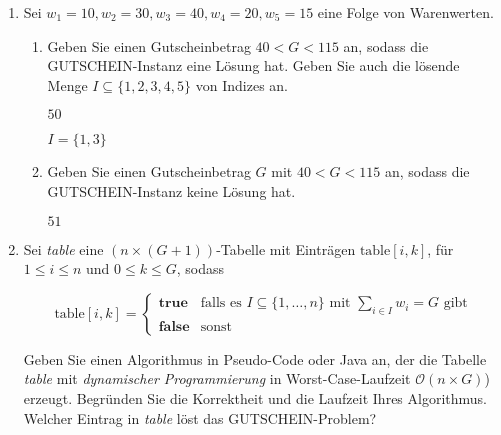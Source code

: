 \documentclass{bschlangaul-aufgabe}
\begin{document}
\begin{enumerate}


\item Sei $w_1 = 10, w_2 = 30, w_3 = 40, w_4 = 20, w_5 = 15$ eine Folge
von Warenwerten.

\begin{enumerate}


\item Geben Sie einen Gutscheinbetrag $40 < G < 115$ an, sodass die
GUT\-SCHEIN-Instanz eine Lösung hat. Geben Sie auch die lösende Menge $I
\subseteq \{ 1, 2, 3, 4, 5 \}$ von Indizes an.

\begin{bAntwort}
$50$

$I = \{ 1, 3 \}$
\end{bAntwort}


\item Geben Sie einen Gutscheinbetrag $G$ mit $40 < G < 115$ an, sodass
die GUTSCHEIN-Instanz keine Lösung hat.

\begin{bAntwort}
$51$
\end{bAntwort}

\end{enumerate}


\item Sei \emph{table} eine $(n \times (G + 1))$-Tabelle mit Einträgen
$\text{table}[i,k]$, für $1 \leq i \leq n$ und $0 \leq k \leq G$, sodass

\begin{equation*}
\text{table}[i,k] =
\begin{cases}
\textbf{true} &
\text{falls es } I \subseteq \{1, \dots, n \} \text{ mit }
\sum_{i \in I} w_i = G \text{ gibt}\\

\textbf{false} & \text{sonst}
\end{cases}
\end{equation*}

Geben Sie einen Algorithmus in Pseudo-Code oder Java an, der die Tabelle
\emph{table} mit \emph{dynamischer Programmierung} in
Worst-Case-Laufzeit $\mathcal{O}(n \times G)$) erzeugt. Begründen Sie
die Korrektheit und die Laufzeit Ihres Algorithmus. Welcher Eintrag in
\emph{table} löst das GUTSCHEIN-Problem?

\begin{bAntwort}
\begin{algorithm}[H]
\newcommand{\meinkommentar}[1]{\texttt{\scriptsize #1}}


\end{algorithm}
\end{bAntwort}
\end{enumerate}
\end{document}
